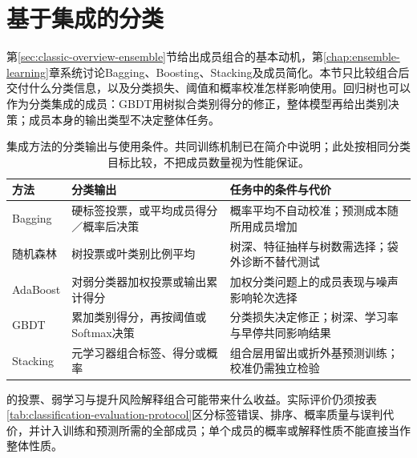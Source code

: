 \section{基于集成的分类}
\label{sec:classification-ensemble}

第\ref{sec:classic-overview-ensemble}节给出成员组合的基本动机，第\ref{chap:ensemble-learning}章系统讨论Bagging、Boosting、Stacking及成员简化。本节只比较组合后交付什么分类信息，以及分类损失、阈值和概率校准怎样影响使用。回归树也可以作为分类集成的成员：GBDT用树拟合类别得分的修正，整体模型再给出类别决策；成员本身的输出类型不决定整体任务。

\begin{table}[htbp]
  \centering
  \small
  \begin{tabularx}{\linewidth}{@{}>{\RaggedRight\arraybackslash}p{22mm}>{\RaggedRight\arraybackslash}X>{\RaggedRight\arraybackslash}X@{}}
    \toprule
    方法 & 分类输出 & 任务中的条件与代价 \\
    \midrule
    Bagging & 硬标签投票，或平均成员得分／概率后决策 & 概率平均不自动校准；预测成本随所用成员增加 \\
    随机森林 & 树投票或叶类别比例平均 & 树深、特征抽样与树数需选择；袋外诊断不替代测试 \\
    AdaBoost & 对弱分类器加权投票或输出累计得分 & 加权分类问题上的成员表现与噪声影响轮次选择 \\
    GBDT & 累加类别得分，再按阈值或Softmax决策 & 分类损失决定修正；树深、学习率与早停共同影响结果 \\
    Stacking & 元学习器组合标签、得分或概率 & 组合层用留出或折外基预测训练；校准仍需独立检验 \\
    \bottomrule
  \end{tabularx}
  \caption{集成方法的分类输出与使用条件。共同训练机制已在简介中说明；此处按相同分类目标比较，不把成员数量视为性能保证。}
  \label{tab:classification-ensemble-map}
\end{table}

的投票、弱学习与提升风险解释组合可能带来什么收益。实际评价仍须按表\ref{tab:classification-evaluation-protocol}区分标签错误、排序、概率质量与误判代价，并计入训练和预测所需的全部成员；单个成员的概率或解释性质不能直接当作整体性质。
